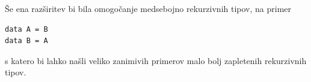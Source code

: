 \documentclass[a4paper,12pt,openright]{book}
\begin{document}
Še ena razširitev bi bila omogočanje medsebojno rekurzivnih tipov, na primer 
\begin{lstlisting}
data A = B
data B = A
\end{lstlisting}
s katero bi lahko našli veliko zanimivih primerov malo bolj zapletenih rekurzivnih tipov.




\raggedright

\printbibliography[heading=bibintoc,title={Literatura}]
\end{document}
